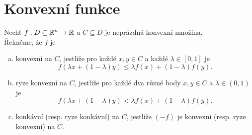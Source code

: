 \section{Konvexní funkce}\label{defKonv}

Nechť $f : D \subseteq \mathbb{R}^n \rightarrow \mathbb{R}$ a $C \subseteq D$ je neprázdná konvexní množina. \\
Řekněme, že $f$ je
\begin{enumerate}[(a)]
    \item konvexní na $C$, jestliže pro každé $x, y \in C$ a každé $\lambda \in [0,1]$ je 
    \[
        f(\lambda x + (1-\lambda) y) \leq \lambda f(x) + (1-\lambda)f(y).
    \]
    \item ryze konvexní na $C$, jestliže pro každé dva různé body $x, y \in C$ a $\lambda \in (0,1)$ je
    \[
        f(\lambda x + (1-\lambda) y) < \lambda f(x) + (1-\lambda)f(y).
    \]
    \item konkávní (resp. ryze konkávní) na $C$, jestliže $(-f)$ je konvexní (resp. ryze konvexní) na $C$.
\end{enumerate}


